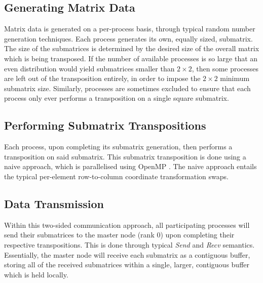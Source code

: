 \documentclass[journal,10pt,a4paper]{IEEEtran}
\begin{document}


\subsection{Generating Matrix Data}

Matrix data is generated on a per-process basis, through typical random number generation techniques. Each process generates its own, equally sized, submatrix. The size of the submatrices is determined by the desired size of the overall matrix which is being transposed. If the number of available processes is so large that an even distribution would yield submatrices smaller than $2 \times 2$, then some processes are left out of the transposition entirely, in order to impose the $2 \times 2$ minimum submatrix size. Similarly, processes are sometimes excluded to ensure that each process only ever performs a transposition on a single square submatrix.



\subsection{Performing Submatrix Transpositions}

Each process, upon completing its submatrix generation, then performs a transposition on said submatrix. This submatrix transposition is done using a naive approach, which is parallelised using OpenMP \cite{omp}. The naive approach entails the typical per-element row-to-column coordinate transformation swaps.

\subsection{Data Transmission}

Within this two-sided communication approach, all participating processes will send their submatrices to the master node (rank 0) upon completing their respective transpositions. This is done through typical \textit{Send} and \textit{Recv} semantics. Essentially, the master node will receive each submatrix as a contiguous buffer, storing all of the received submatrices within a single, larger, contiguous buffer which is held locally.
\end{document}
